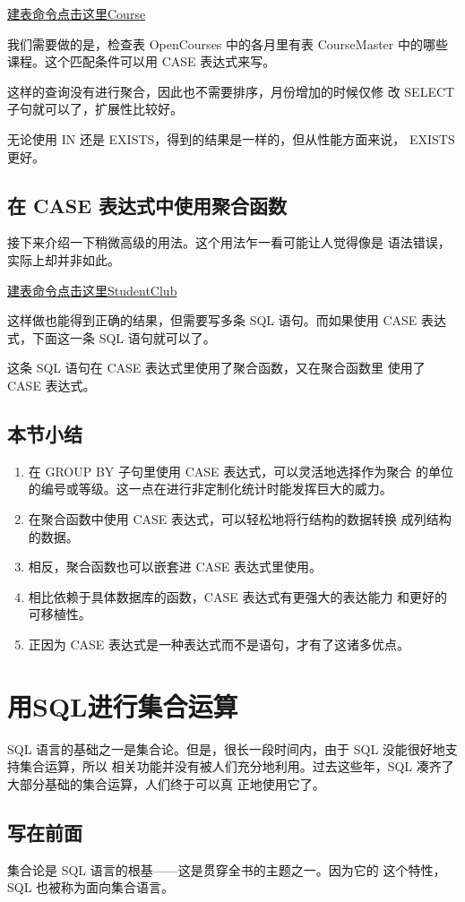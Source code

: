 \href{}{建表命令点击这里Course}

我们需要做的是，检查表 OpenCourses 中的各月里有表 CourseMaster
中的哪些课程。这个匹配条件可以用 CASE 表达式来写。


这样的查询没有进行聚合，因此也不需要排序，月份增加的时候仅修
改 SELECT 子句就可以了，扩展性比较好。

无论使用 IN 还是 EXISTS，得到的结果是一样的，但从性能方面来说，
EXISTS 更好。

\subsection{在 CASE 表达式中使用聚合函数}
接下来介绍一下稍微高级的用法。这个用法乍一看可能让人觉得像是
语法错误，实际上却并非如此。

\href{}{建表命令点击这里StudentClub}


这样做也能得到正确的结果，但需要写多条 SQL 语句。而如果使用
CASE 表达式，下面这一条 SQL 语句就可以了。


这条 SQL 语句在 CASE 表达式里使用了聚合函数，又在聚合函数里
使用了 CASE 表达式。

\subsection{本节小结}
\begin{enumerate}
    \item 在 GROUP BY 子句里使用 CASE 表达式，可以灵活地选择作为聚合
          的单位的编号或等级。这一点在进行非定制化统计时能发挥巨大的威力。
    \item 在聚合函数中使用 CASE 表达式，可以轻松地将行结构的数据转换
          成列结构的数据。
    \item 相反，聚合函数也可以嵌套进 CASE 表达式里使用。
    \item 相比依赖于具体数据库的函数，CASE 表达式有更强大的表达能力
          和更好的可移植性。
    \item 正因为 CASE 表达式是一种表达式而不是语句，才有了这诸多优点。
\end{enumerate}

\section{用SQL进行集合运算}
SQL 语言的基础之一是集合论。但是，很长一段时间内，由于 SQL 没能很好地支持集合运算，所以
相关功能并没有被人们充分地利用。过去这些年，SQL 凑齐了大部分基础的集合运算，人们终于可以真
正地使用它了。
\subsection{写在前面}
集合论是 SQL 语言的根基——这是贯穿全书的主题之一。因为它的
这个特性，SQL 也被称为面向集合语言。

